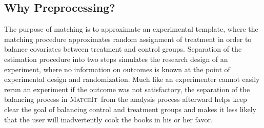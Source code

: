 \documentclass[oneside,letterpaper,titlepage]{article}
\newcommand{\MatchIt}{\textsc{MatchIt}}
\begin{document}
\subsection{Why Preprocessing?}

The purpose of matching is to approximate an experimental template,
where the matching procedure approximates random assignment of
treatment in order to balance covariates between treatment and control
groups.  Separation of the estimation procedure into two steps
simulates the research design of an experiment, where no information
on outcomes is known at the point of experimental design and
randomization.  Much like an experimenter cannot easily rerun an
experiment if the outcome was not satisfactory, the separation of the
balancing process in \MatchIt\ from the analysis process afterward
helps keep clear the goal of balancing control and treatment groups
and makes it less likely that the user will inadvertently cook the
books in his or her favor.

\clearpage


\end{document}
